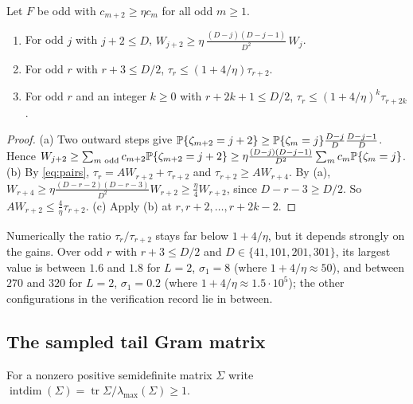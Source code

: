\begin{lemma}\label{lem:transfer}
Let $F$ be odd with $c_{m+2}\ge\eta c_m$ for all odd $m\ge1$.
\begin{enumerate}
\item[(a)] For odd $j$ with $j+2\le D$,
$W_{j+2}\ge\eta\,\frac{(D-j)(D-j-1)}{D^2}\,W_j$.
\item[(b)] For odd $r$ with $r+3\le D/2$, $\tau_r\le(1+4/\eta)\tau_{r+2}$.
\item[(c)] For odd $r$ and an integer $k\ge0$ with $r+2k+1\le D/2$,
$\tau_r\le(1+4/\eta)^k\tau_{r+2k}$.
\end{enumerate}
\end{lemma}
\begin{proof}
(a) Two outward steps give
$\mathbb P\{\zeta_{m+2}=j+2\}\ge\mathbb P\{\zeta_m=j\}\frac{D-j}D\frac{D-j-1}D$. Hence
$W_{j+2}\ge\sum_{m\text{ odd}}c_{m+2}\mathbb P\{\zeta_{m+2}=j+2\}
\ge\eta\frac{(D-j)(D-j-1)}{D^2}\sum_mc_m\mathbb P\{\zeta_m=j\}$.
(b) By \eqref{eq:pairs}, $\tau_r=AW_{r+2}+\tau_{r+2}$ and
$\tau_{r+2}\ge AW_{r+4}$. By (a),
$W_{r+4}\ge\eta\frac{(D-r-2)(D-r-3)}{D^2}W_{r+2}\ge\frac\eta4W_{r+2}$,
since $D-r-3\ge D/2$. So $AW_{r+2}\le\frac4\eta\tau_{r+2}$.
(c) Apply (b) at $r,r+2,\ldots,r+2k-2$.
\end{proof}

Numerically the ratio $\tau_r/\tau_{r+2}$ stays far below $1+4/\eta$, but
it depends strongly on the gains. Over odd $r$ with $r+3\le D/2$ and
$D\in\{41,101,201,301\}$, its largest value is between $1.6$ and $1.8$ for
$L=2$, $\sigma_1=8$ (where $1+4/\eta\approx50$), and between $270$ and
$320$ for $L=2$, $\sigma_1=0.2$ (where $1+4/\eta\approx1.5\cdot10^5$); the
other configurations in the verification record lie in between.

\subsection{The sampled tail Gram matrix}\label{sec:intdim}
For a nonzero positive semidefinite matrix $\Sigma$ write
$\operatorname{intdim}(\Sigma)=\operatorname{tr}\Sigma/\lambda_{\max}(\Sigma)\ge1$.

